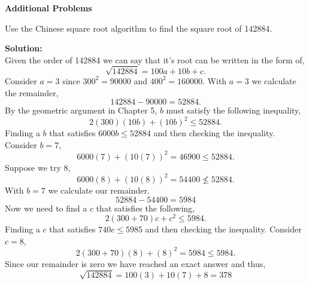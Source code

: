 \documentclass[12pt]{article}
\makeatletter
\theoremstyle{homework}
\newenvironment{exercise}[1]
{\def\@currentlabel{#1}\exercisecore}
{\endexercisecore}
\newcommand{\localhead}[1]{\par\smallskip\noindent\textbf{#1}\nobreak\\}%
\newcommand\solution{\localhead{Solution:}}
\makeatother
\begin{document}
\textbf{Additional Problems}


\begin{exercise}{1} Use the Chinese square root algorithm to find the square root of 142884.\\
  \solution Given the order of 142884 we can say that it's root can be written in the form of, 
  \begin{equation*}
    \sqrt{142884} = 100a + 10b + c. 
  \end{equation*}
  Consider $a = 3$ since $300^2 = 90000$ and $400^2 = 160000$. With $a = 3$ we calculate the remainder, 
  \begin{equation*}
    142884 - 90000 = 52884.
  \end{equation*}
  By the geometric argument in Chapter 5, $b$ must satisfy the following inequality,
  \begin{equation*}
    2(300)(10b)+(10b)^2 \le 52884.
  \end{equation*}
Finding a $b$ that satisfies $6000b \le 52884$ and then checking the inequality. Consider $b = 7$, 
\begin{equation*}
  6000(7) + (10(7))^2 = 46900 \le 52884. 
\end{equation*}
Suppose we try $8$,
\begin{equation*}
  6000(8) + (10(8))^2 = 54400 \not\le 52884. 
\end{equation*}
With $b = 7$ we calculate our remainder. 
\begin{equation*}
 52884 - 54400  = 5984
\end{equation*}
Now we need to find a $c$ that satisfies the following, 
\begin{equation*}
  2(300 + 70)c + c^2 \le 5984.
\end{equation*}
Finding a $c$ that satisfies $740c \le 5985$ and then checking the inequality. Consider $c = 8$,
\begin{equation*}
  2(300 + 70)(8) + (8)^2 = 5984 \le 5984.
\end{equation*}
Since our remainder is zero we have reached an exact answer and thus, 
\begin{equation*}
  \sqrt{142884} = 100(3) + 10(7) + 8 = 378
\end{equation*}
\end{exercise}
\vspace{.5in}
\end{document}
